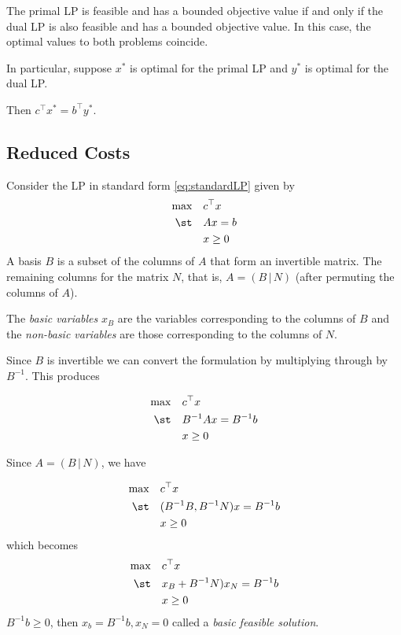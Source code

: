 \begin{theorem}
The primal LP is feasible and has a bounded objective value if and only if the dual LP is also feasible and has a bounded objective value.  In this case, the optimal values to both problems coincide.

In particular, suppose $x^*$ is optimal for the primal LP and $y^*$ is optimal for the dual LP.

Then $c^\top x^* = b^\top y^*$.
\end{theorem}

\subsection{Reduced Costs}
Consider the LP in standard form \eqref{eq:standardLP} given by 
\begin{equation}
\begin{split}
\max \quad & c^\top x\\
\st  \quad & Ax = b\\
& x \geq 0
\end{split}
\end{equation}
 A basis $B$ is a subset of the columns of $A$ that form an invertible matrix.  The remaining columns for the matrix $N$, that is, $A = (B\, | \, N)$ (after permuting the columns of $A$).  
 
 The \emph{basic variables} $x_B$ are the variables corresponding to the columns of $B$ and the \emph{non-basic variables} are those corresponding to the columns of $N$.  
 
 Since $B$ is invertible we can convert the formulation by multiplying through by $B^{-1}$.  This produces
 
  \begin{equation}
\begin{split}
\max \quad & c^\top x\\
\st  \quad & B^{-1}Ax = B^{-1}b\\
& x \geq 0
\end{split}
\end{equation}

Since $A = (B \,|\, N)$, we have 

  \begin{equation}
\begin{split}
\max \quad & c^\top x\\
\st  \quad & (B^{-1}B, B^{-1} N) x = B^{-1}b\\
& x \geq 0
\end{split}
\end{equation}
which becomes 
 \begin{equation}
\begin{split}
\max \quad & c^\top x\\
\st  \quad &x_B +  B^{-1} N) x_N = B^{-1}b\\
& x \geq 0
\end{split}
\end{equation}
$B^{-1}b \geq 0$, then $x_b = B^{-1}b, x_N = 0$ called a \emph{basic feasible solution}.  

